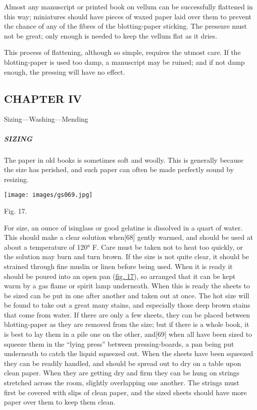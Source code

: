 \documentclass[
]{article}
\begin{document}
Almost any manuscript or printed book on vellum can be successfully
flattened in this way; miniatures should have pieces of waxed paper laid
over them to prevent the chance of any of the fibres of the
blotting-paper sticking. The pressure must not be great; only enough is
needed to keep the vellum flat as it dries.

This process of flattening, although so simple, requires the utmost
care. If the blotting-paper is used too damp, a manuscript may be
ruined; and if not damp enough, the pressing will have no effect.

\hypertarget{chapter-iv}{%
\subsection[CHAPTER
IV]{\texorpdfstring{\protect\hypertarget{CHAPTER_IV}{}{}CHAPTER
IV}{CHAPTER IV}}\label{chapter-iv}}

Sizing---Washing---Mending

\hypertarget{sizing}{%
\subparagraph{SIZING}\label{sizing}}

{The} paper in old books is sometimes soft and woolly. This is generally
because the size has perished, and such paper can often be made
perfectly sound by resizing.

\protect\hypertarget{Fig_17}{}{}
\texttt{[image: images/gs069.jpg]}

Fig. 17.

For size, an ounce of isinglass or good gelatine is dissolved in a quart
of water. This should make a clear solution
when{\protect\hypertarget{Page_68}{}{{[}68{]}}} gently warmed, and
should be used at about a temperature of 120° F. Care must be taken not
to heat too quickly, or the solution may burn and turn brown. If the
size is not quite clear, it should be strained through fine muslin or
linen before being used. When it is ready it should be poured into an
open pan (\protect\hyperlink{Fig_17}{fig. 17}), so arranged that it can
be kept warm by a gas flame or spirit lamp underneath. When this is
ready the sheets to be sized can be put in one after another and taken
out at once. The hot size will be found to take out a great many stains,
and especially those deep brown stains that come from water. If there
are only a few sheets, they can be placed between blotting-paper as they
are removed from the size; but if there is a whole book, it is best to
lay them in a pile one on the other,
and{\protect\hypertarget{Page_69}{}{{[}69{]}}} when all have been sized
to squeeze them in the ``lying press'' between pressing-boards, a pan
being put underneath to catch the liquid squeezed out. When the sheets
have been squeezed they can be readily handled, and should be spread out
to dry on a table upon clean paper. When they are getting dry and firm
they can be hung on strings stretched across the room, slightly
overlapping one another. The strings must first be covered with slips of
clean paper, and the sized sheets should have more paper over them to
keep them clean.
\end{document}
